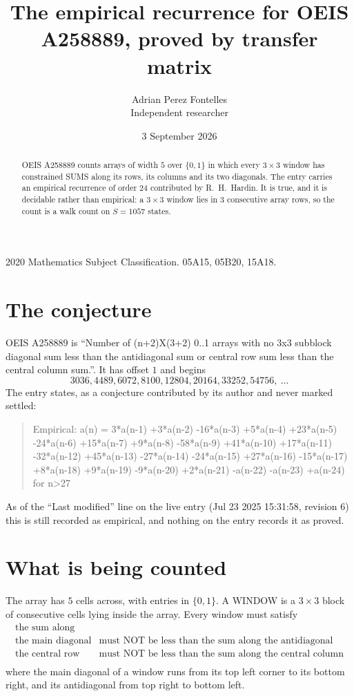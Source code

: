 \documentclass[11pt,a4paper]{article}
\title{The empirical recurrence for OEIS A258889, proved by transfer matrix}
\author{Adrian Perez Fontelles\\ \small Independent researcher}
\date{3 September 2026}
\theoremstyle{plain}
\theoremstyle{definition}
\begin{document}
\maketitle

\begin{abstract}
OEIS A258889 counts arrays of width $5$ over $\{0,1\}$ in which every $3\times3$ window has
constrained SUMS along its rows, its columns and its two diagonals. The entry carries an
empirical recurrence of order $24$ contributed by R.~H.~Hardin. It is true, and it is
decidable rather than empirical: a $3\times3$ window lies in $3$ consecutive array rows,
so the count is a walk count on $S=1057$ states.
\end{abstract}

\noindent\small 2020 Mathematics Subject Classification. 05A15, 05B20, 15A18.\normalsize

\section{The conjecture}

OEIS A258889 is ``Number of (n+2)X(3+2) 0..1 arrays with no 3x3 subblock diagonal sum less than the antidiagonal sum or central row sum less than the central column sum.''. It has offset $1$ and begins
\[
3036, 4489, 6072, 8100, 12804, 20164, 33252, 54756,\ \dots
\]
The entry states, as a conjecture contributed by its author and never marked settled:
\begin{quote}
Empirical: a(n) = 3*a(n-1) +3*a(n-2) -16*a(n-3) +5*a(n-4) +23*a(n-5) -24*a(n-6) +15*a(n-7) +9*a(n-8) -58*a(n-9) +41*a(n-10) +17*a(n-11) -32*a(n-12) +45*a(n-13) -27*a(n-14) -24*a(n-15) +27*a(n-16) -15*a(n-17) +8*a(n-18) +9*a(n-19) -9*a(n-20) +2*a(n-21) -a(n-22) -a(n-23) +a(n-24) for n>27
\end{quote}
As of the ``Last modified'' line on the live entry (Jul 23 2025 15:31:58, revision 6) this is still
recorded as empirical, and nothing on the entry records it as proved.

\section{What is being counted}

The array has $5$ cells across, with entries in $\{0,1\}$. A WINDOW is a $3\times3$ block
of consecutive cells lying inside the array. Every window must satisfy
\[
\begin{array}{ll}
\text{the sum along} & \text{} \\[2pt]
\text{the main diagonal} & \text{must NOT be less than the sum along the antidiagonal} \\
\text{the central row} & \text{must NOT be less than the sum along the central column} \\
\end{array}
\]
where the main diagonal of a window runs from its top left corner to its bottom right, and its
antidiagonal from top right to bottom left.
\end{document}
